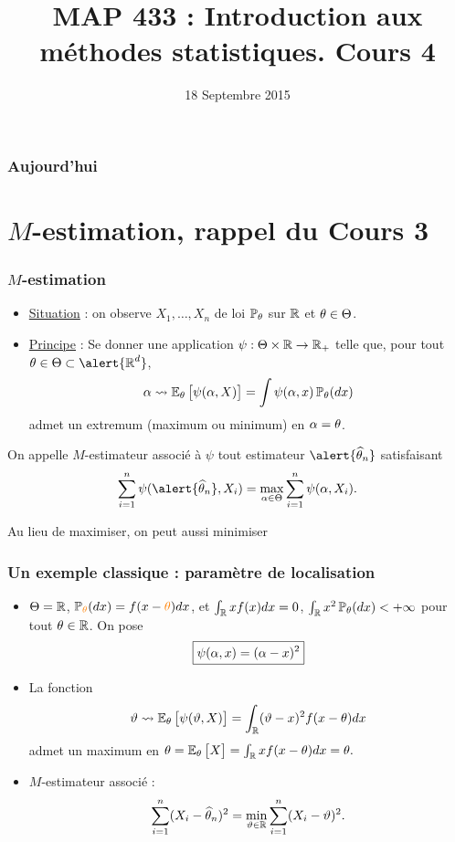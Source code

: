 
\title{MAP 433 : Introduction aux méthodes statistiques. Cours 4}

\date{18 Septembre 2015}
\maketitle



\begin{frame}
\frametitle{Aujourd'hui}
\tableofcontents
\end{frame}


\section{$M$-estimation, rappel du Cours 3}

\begin{frame}
\frametitle{$M$-estimation}
\begin{itemize}
\item \underline{Situation} : on observe $X_1,\ldots, X_n$ de loi $\operatorname{{\mathbb P}}_{\theta}$ sur $\operatorname{{\mathbb R}}$ et $\theta \in \Theta$.
\item \underline{Principe} : Se donner une application $\psi : \Theta \times \operatorname{{\mathbb R}} \rightarrow \operatorname{{\mathbb R}}_+$ telle que, pour tout $\truetheta \in \Theta \subset \alert{\R^d}$,
$$\alpha \leadsto \operatorname{{\mathbb E}}_\theta\big[\psi(\alpha,X)\big] = \int \psi(\alpha,x)\operatorname{{\mathbb P}}_\theta(dx)$$
admet \alert{un extremum (\alert{maximum ou minimum}) en $\alpha=\theta$}.
\end{itemize}
\begin{df}
On appelle $M$-estimateur associé à $\psi$ tout estimateur $\alert{\est}$ satisfaisant
$$\sum_{i = 1}^n \psi(\alert{\est}, X_i) = \max_{\curtheta \in \Theta}\sum_{i = 1}^n\psi(\curtheta, X_i).$$
\end{df}
Au lieu de maximiser, on peut aussi minimiser
\end{frame}

\begin{frame}
\frametitle{Un exemple classique : paramètre de localisation}
\begin{itemize}
\item $\Theta = \operatorname{{\mathbb R}}$, $\PP_{\tco{\truetheta}}(dx) = f(x-{\tco{\truetheta}})dx$, et $\int_{\operatorname{{\mathbb R}}}xf(x)dx=0$, $\int_{\operatorname{{\mathbb R}}}x^2\operatorname{{\mathbb P}}_\theta(dx)<+\infty$ pour tout $\theta \in \operatorname{{\mathbb R}}$. On pose
$$\boxed{\psi(\alpha,x)=(\alpha-x)^2}$$
\item La fonction
$$\vartheta \leadsto \operatorname{{\mathbb E}}_\theta\big[\psi(\vartheta,X)\big] =
\int_{\operatorname{{\mathbb R}}}(\vartheta-x)^2f(x-\theta)dx$$
admet un \alert{maximum} en $\theta=\operatorname{{\mathbb E}}_\theta\big[X\big] = \int_{\operatorname{{\mathbb R}}}xf(x-\theta)dx=\theta.$
\item \alert{$M$-estimateur associé :}
$$\sum_{i = 1}^n(X_i-\operatorname{\widehat \theta_{\mathnormal{n}}})^2 = \min_{\vartheta \in \operatorname{{\mathbb R}}}\sum_{i = 1}^n (X_i-\vartheta)^2.$$
\end{itemize}
\end{frame}

